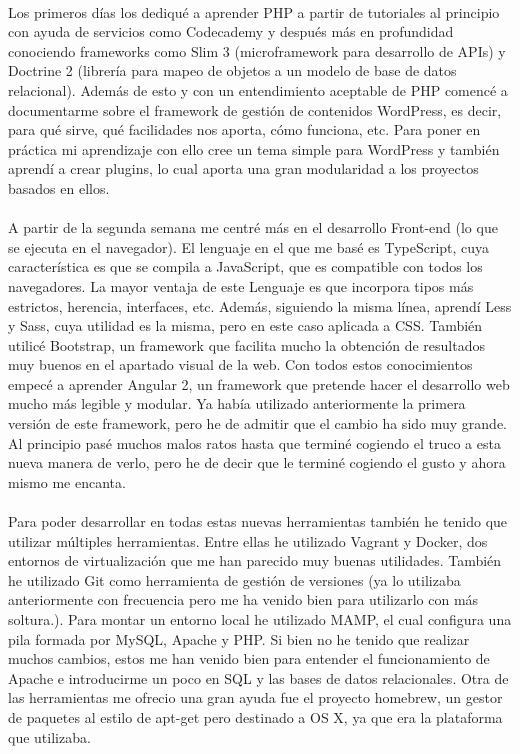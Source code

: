 \documentclass[10pt, a4paper,spanish]{article}
\begin{document}
            \paragraph{}
            Los primeros días los dediqué a aprender PHP a partir de tutoriales al principio con ayuda de servicios como Codecademy y después más en profundidad conociendo frameworks como Slim 3 (microframework para desarrollo de APIs) y Doctrine 2 (librería para mapeo de objetos a un modelo de base de datos relacional). Además de esto y con un entendimiento aceptable de PHP comencé a documentarme sobre el framework de gestión de contenidos WordPress, es decir, para qué sirve, qué facilidades nos aporta, cómo funciona, etc. Para poner en práctica mi aprendizaje con ello cree un tema simple para WordPress y también aprendí a crear plugins, lo cual aporta una gran modularidad a los proyectos basados en ellos.

            \paragraph{}
            A partir de la segunda semana me centré más en el desarrollo Front-end (lo que se ejecuta en el navegador). El lenguaje en el que me basé es TypeScript, cuya característica es que se compila a JavaScript, que es compatible con todos los navegadores. La mayor ventaja de este Lenguaje es que incorpora tipos más estrictos, herencia, interfaces, etc. Además, siguiendo la misma línea, aprendí Less y Sass, cuya utilidad es la misma, pero en este caso aplicada a CSS. También utilicé Bootstrap, un framework que facilita mucho la obtención de resultados muy buenos en el apartado visual de la web. Con todos estos conocimientos empecé a aprender Angular 2, un framework que pretende hacer el desarrollo web mucho más legible y modular. Ya había utilizado anteriormente la primera versión de este framework, pero he de admitir que el cambio ha sido muy grande. Al principio pasé muchos malos ratos hasta que terminé cogiendo el truco a esta nueva manera de verlo, pero he de decir que le terminé cogiendo el gusto y ahora mismo me encanta.

            \paragraph{}
            Para poder desarrollar en todas estas nuevas herramientas también he tenido que utilizar múltiples herramientas. Entre ellas he utilizado Vagrant y Docker, dos entornos de virtualización que me han parecido muy buenas utilidades. También he utilizado Git como herramienta de gestión de versiones (ya lo utilizaba anteriormente con frecuencia pero me ha venido bien para utilizarlo con más soltura.). Para montar un entorno local he utilizado MAMP, el cual configura una pila formada por MySQL, Apache y PHP. Si bien no he tenido que realizar muchos cambios, estos me han venido bien para entender el funcionamiento de Apache e introducirme un poco en SQL y las bases de datos relacionales. Otra de las herramientas me ofrecio una gran ayuda fue el proyecto homebrew, un gestor de paquetes al estilo de apt-get pero destinado a OS X, ya que era la plataforma que utilizaba.
\end{document}
